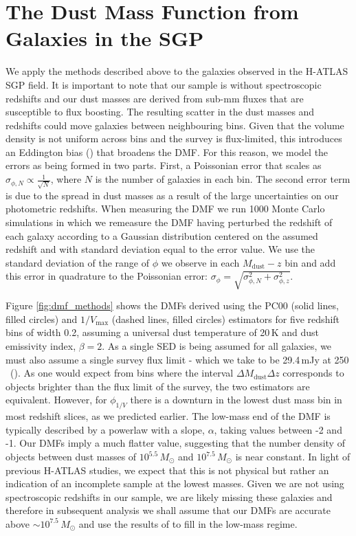 \section{The Dust Mass Function from Galaxies in the SGP}
\label{sec:dmf_from_sgp}

We apply the methods described above to the galaxies observed in the H-ATLAS SGP field. It is important to note that our sample is without spectroscopic redshifts and our dust masses are derived from sub-mm fluxes that are susceptible to flux boosting. The resulting scatter in the dust masses and redshifts could move galaxies between neighbouring bins. Given that the volume density is not uniform across bins and the survey is flux-limited, this introduces an Eddington bias (\citealt{Eddington_1913}) that broadens the DMF. For this reason, we model the errors as being formed in two parts. First, a Poissonian error that scales as $\sigma_{\phi,N} \propto \frac{1}{\sqrt{N}}$, where $N$ is the number of galaxies in each bin. The second error term is due to the spread in dust masses as a result of the large uncertainties on our photometric redshifts. When measuring the DMF we run 1000 Monte Carlo simulations in which we remeasure the DMF having perturbed the redshift of each galaxy according to a Gaussian distribution centered on the assumed redshift and with standard deviation equal to the error value. We use the standard deviation of the range of $\phi$ we observe in each $M_{\textrm{dust}} - z$ bin and add this error in quadrature to the Poissonian error: $\sigma_\phi = \sqrt{\sigma_{\phi,N}^2 + \sigma_{\phi,z}^2}$.

Figure \ref{fig:dmf_methods} shows the DMFs derived using the PC00 (solid lines, filled circles) and $1/V_{\textrm{max}}$ (dashed lines, filled circles) estimators for five redshift bins of width 0.2, assuming a universal dust temperature of 20\,K and dust emissivity index, $\beta = 2$. As a single SED is being assumed for all galaxies, we must also assume a single survey flux limit - which we take to be 29.4\,mJy at 250\,\micron\ (\citealt{Valiante_2016}). As one would expect from bins where the interval $\Delta M_{\textrm{dust}} \Delta z$ corresponds to objects brighter than the flux limit of the survey, the two estimators are equivalent. However, for $\phi_{1/V}$ there is a downturn in the lowest dust mass bin in most redshift slices, as we predicted earlier. The low-mass end of the DMF is typically described by a powerlaw with a slope, $\alpha$, taking values between -2 and -1. Our DMFs imply a much flatter value, suggesting that the number density of objects between dust masses of $10^{5.5}\,M_{\odot}$ and $10^{7.5}\,M_{\odot}$ is near constant. In light of previous H-ATLAS studies, we expect that this is not physical but rather an indication of an incomplete sample at the lowest masses. Given we are not using spectroscopic redshifts in our sample, we are likely missing these galaxies and therefore in subsequent analysis we shall assume that our DMFs are accurate above $\sim 10^{7.5}\,M_{\odot}$ and use the results of \citealt{Beeston_2018} to fill in the low-mass regime. 

